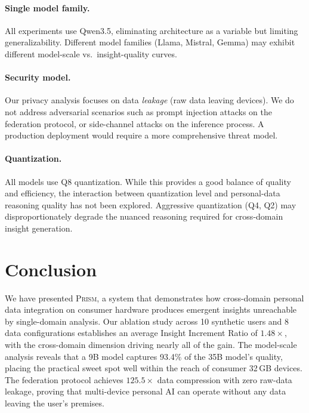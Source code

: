 \documentclass[11pt,a4paper]{article}
\newcommand{\echostream}{\textsc{Prism}}
\begin{document}
\paragraph{Single model family.} All experiments use Qwen3.5, eliminating
architecture as a variable but limiting generalizability. Different model
families (Llama, Mistral, Gemma) may exhibit different model-scale vs.\
insight-quality curves.

\paragraph{Security model.} Our privacy analysis focuses on data
\emph{leakage} (raw data leaving devices). We do not address adversarial
scenarios such as prompt injection attacks on the federation protocol, or
side-channel attacks on the inference process. A production deployment would
require a more comprehensive threat model.

\paragraph{Quantization.} All models use Q8 quantization. While this
provides a good balance of quality and efficiency, the interaction between
quantization level and personal-data reasoning quality has not been explored.
Aggressive quantization (Q4, Q2) may disproportionately degrade the nuanced
reasoning required for cross-domain insight generation.


\section{Conclusion}
\label{sec:conclusion}

We have presented \echostream{}, a system that demonstrates how cross-domain
personal data integration on consumer hardware produces emergent insights
unreachable by single-domain analysis. Our ablation study across 10 synthetic
users and 8 data configurations establishes an average Insight Increment Ratio
of $1.48\times$, with the cross-domain dimension driving nearly all of the
gain. The model-scale analysis reveals that a 9B model captures 93.4\% of the
35B model's quality, placing the practical sweet spot well within the reach
of consumer 32\,GB devices. The federation protocol achieves $125.5\times$
data compression with zero raw-data leakage, proving that multi-device
personal AI can operate without any data leaving the user's premises.
\end{document}
